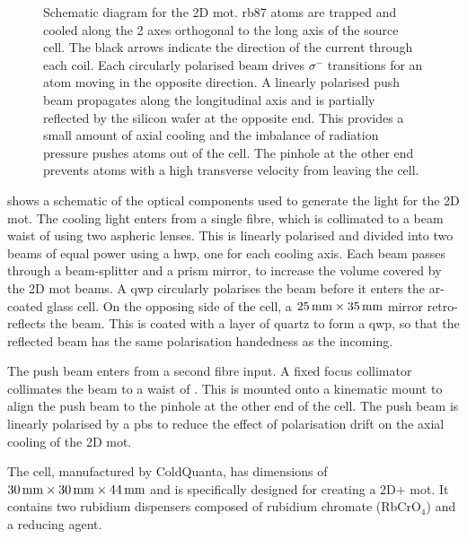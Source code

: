\begin{figure}[!htbp]
	\centering
	\def\svgwidth{0.5\textwidth}
	
	\caption[Schematic for the 2D \ac{mot}]{Schematic diagram for the 2D \ac{mot}. \ac{rb87} atoms are trapped and cooled along the 2 axes orthogonal to the long axis of the source cell. The black arrows indicate the direction of the current through each coil. Each circularly polarised beam drives \(\sigma^-\) transitions for an atom moving in the opposite direction. A linearly polarised push beam propagates along the longitudinal axis and is partially reflected by the silicon wafer at the opposite end. This provides a small amount of axial cooling and the imbalance of radiation pressure pushes atoms out of the cell. The pinhole at the other end prevents atoms with a high transverse velocity from leaving the cell.}
	\label{fig:2D_mot_diagram}
\end{figure}
 shows a schematic of the optical
components used to generate the light for the 2D \ac{mot}. The cooling
light enters from a single
fibre, which is collimated to a beam waist of
 using two aspheric lenses. This is
linearly polarised and divided
into two beams of equal power using a \ac{hwp}, one for each cooling
axis. Each beam passes
through a beam-splitter and a prism mirror, to increase the volume
covered by
the 2D \ac{mot} beams. A \ac{qwp} circularly polarises the beam before
it enters the ar-coated glass cell. On the opposing side of the cell, a
\(\sivalue{25}{\milli\metre} \times \sivalue{35}{\milli\metre}\) mirror retro-reflects the beam. This is coated with a layer of quartz to form a \ac{qwp}, so that the
reflected beam has the same polarisation handedness as the incoming.
\par\noindent 
The push beam enters from a second fibre input. A fixed focus collimator collimates
the beam to a waist of . This is mounted onto a
 kinematic mount to align the push beam to the  pinhole at the other end of the cell. The push beam is linearly polarised by a \ac{pbs} to reduce the effect of
polarisation drift on the axial cooling of the 2D \ac{mot}. 
\par\noindent
The cell,
manufactured by ColdQuanta, has dimensions of \(\sivalue{30}{\milli\metre}
\times \sivalue{30}{\milli\metre} \times \sivalue{44}{\milli\metre}\) and is
specifically designed for creating a 2D\(+\) \ac{mot}. It contains two rubidium
dispensers composed of rubidium chromate (RbCrO\(_4\)) and a reducing agent.
